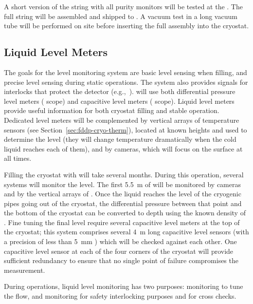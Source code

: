 A short version of the %
string 
with all purity monitors will be tested at the . 
The full string will be assembled and shipped to  . 
 A vacuum test in a long vacuum tube will be performed on site before inserting the full assembly into the  cryostat. 


\subsection{Liquid Level Meters}



The goals for the  level monitoring system are basic level sensing when filling, and precise level sensing during static operations.  The system also provides signals for  interlocks that protect the detector (e.g.,\ ).  will use both differential pressure level meters ( scope) and capacitive level meters ( scope). Liquid level meters provide useful information for both cryostat filling and stable operation. Dedicated level meters will be complemented by vertical arrays of temperature sensors (see Section~\ref{sec:fddp-cryo-therm}), located at known heights and used to determine the \lar level (they will change temperature dramatically when the cold liquid reaches each of them), and by cameras, which will focus on the \lar surface at all times.  

Filling the cryostat with \lar will take several months. During this operation, several systems will monitor the \lar level. 
The first \SI{5.5}{m} of  will be monitored by cameras and by the vertical arrays of . Once the liquid reaches the level of the cryogenic pipes going out of the cryostat, 
the differential pressure between that point and the bottom of the cryostat
can be converted to depth using
the known density of \lar.  Fine tuning the final  level require several capacitive level meters at the top of the cryostat; this system comprises several \SI{4}{m}  long capacitive level sensors (with a precision of less than \SI{5}{mm} ) which will be checked against each other. One capacitive level sensor at each of the four corners of the cryostat will provide sufficient redundancy to ensure that no single point of failure compromises the %
measurement.


During operations, liquid level monitoring has two purposes:
monitoring to tune the \lar flow, and monitoring for safety interlocking purposes and for cross checks. 



